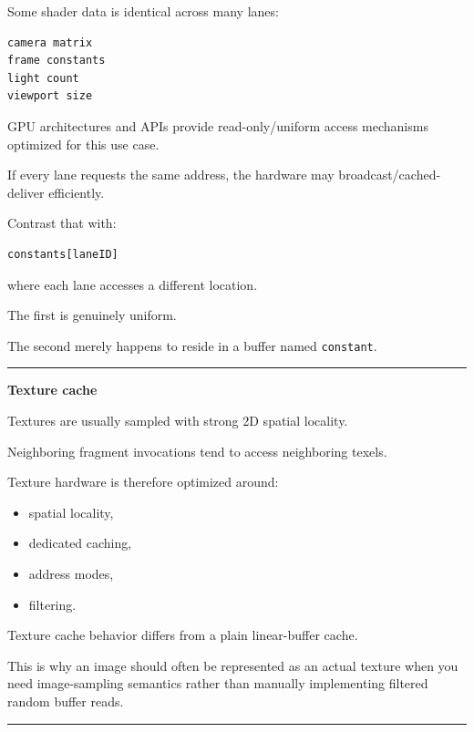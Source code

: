 Some shader data is identical across many lanes:

\protect{}\label{xfh30n}%
\begin{verbatim}
camera matrix
frame constants
light count
viewport size
\end{verbatim}

GPU architectures and APIs provide read-only/uniform access mechanisms optimized for this use case.

If every lane requests the same address, the hardware may broadcast/cached-deliver efficiently.

Contrast that with:

\protect{}\label{7e3tbt}%
\begin{verbatim}
constants[laneID]
\end{verbatim}

where each lane accesses a different location.

The first is genuinely uniform.

The second merely happens to reside in a buffer named \texttt{constant}.

\begin{center}\rule{0.5\linewidth}{0.5pt}\end{center}

\textbf{Texture cache}

Textures are usually sampled with strong 2D spatial locality.

Neighboring fragment invocations tend to access neighboring texels.

Texture hardware is therefore optimized around:

\begin{itemize}
\tightlist
\item
  spatial locality,
\item
  dedicated caching,
\item
  address modes,
\item
  filtering.
\end{itemize}

Texture cache behavior differs from a plain linear-buffer cache.

This is why an image should often be represented as an actual texture when you need image-sampling semantics rather than manually implementing filtered random buffer reads.

\begin{center}\rule{0.5\linewidth}{0.5pt}\end{center}

